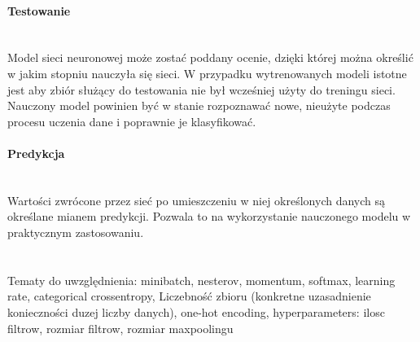 \paragraph{Testowanie} \mbox{}\\
Model sieci neuronowej może zostać poddany ocenie, dzięki której można określić w jakim stopniu
nauczyła się sieci. W przypadku wytrenowanych modeli istotne jest aby zbiór służący do
testowania nie był wcześniej użyty do treningu sieci. Nauczony model powinien być w stanie
rozpoznawać nowe, nieużyte podczas procesu uczenia dane i poprawnie je klasyfikować.

\paragraph{Predykcja} \mbox{}\\
Wartości zwrócone przez sieć po umieszczeniu w niej określonych danych są określane
mianem predykcji. Pozwala to na wykorzystanie nauczonego modelu w praktycznym
zastosowaniu. \\ \\ \\

Tematy do uwzględnienia:
minibatch,
nesterov,
momentum,
softmax,
learning rate,
categorical crossentropy,
Liczebność zbioru (konkretne uzasadnienie konieczności duzej liczby danych),
one-hot encoding,
hyperparameters: ilosc filtrow, rozmiar filtrow, rozmiar maxpoolingu
